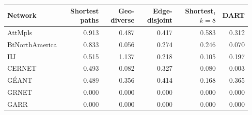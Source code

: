 \begin{tabular}{lrrrrr}
\toprule
Network & Shortest paths & Geo-diverse & Edge-disjoint & Shortest, $k=8$ & DART \\
\midrule
AttMpls & 0.913 & 0.487 & 0.417 & 0.583 & 0.312 \\
BtNorthAmerica & 0.833 & 0.056 & 0.274 & 0.246 & 0.070 \\
IIJ & 0.515 & 1.137 & 0.218 & 0.105 & 0.197 \\
CERNET & 0.493 & 0.082 & 0.327 & 0.080 & 0.003 \\
G\'EANT & 0.489 & 0.356 & 0.414 & 0.168 & 0.365 \\
GRNET & 0.000 & 0.000 & 0.000 & 0.000 & 0.000 \\
GARR & 0.000 & 0.000 & 0.000 & 0.000 & 0.000 \\
\bottomrule
\end{tabular}
